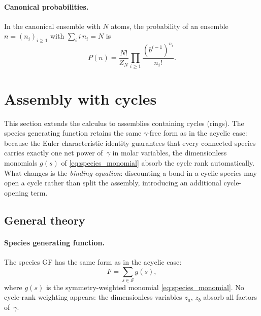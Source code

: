 \documentclass[11pt]{amsart}
\newcommand{\Species}{\mathcal{S}}
\newcommand{\GFspecies}{F}
\newcommand{\GFensemble}{Z}
\theoremstyle{definition}
\theoremstyle{plain}
\theoremstyle{remark}
\begin{document}
\paragraph{Canonical probabilities.}
In the canonical ensemble with $N$ atoms, the probability of an ensemble $n=(n_i)_{i\ge 1}$ with $\sum_i i\,n_i = N$ is
\[
P(n) = \frac{N!}{\GFensemble_N}\prod_{i\ge 1}\frac{(b^{i-1})^{n_i}}{n_i!}.
\]


\section{Assembly with cycles}
\label{sec:cycles}

This section extends the calculus to assemblies containing cycles (rings).
The species generating function retains the same $\gamma$-free form as in the acyclic case: because the Euler characteristic identity guarantees that every connected species carries exactly one net power of~$\gamma$ in molar variables, the dimensionless monomials $g(s)$ of \eqref{eq:species_monomial} absorb the cycle rank automatically.
What changes is the \emph{binding equation}: discounting a bond in a cyclic species may open a cycle rather than split the assembly, introducing an additional cycle-opening term.

\subsection{General theory}
\label{sec:cycles_general}

\paragraph{Species generating function.}
The species GF has the same form as in the acyclic case:
\begin{equation}\label{eq:cycle_weighted_species_gf}
\GFspecies = \sum_{s\in\Species} g(s),
\end{equation}
where $g(s)$ is the symmetry-weighted monomial \eqref{eq:species_monomial}.
No cycle-rank weighting appears: the dimensionless variables $z_a$, $z_b$ absorb all factors of~$\gamma$.
\end{document}
